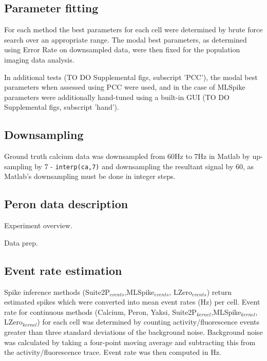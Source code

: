 \documentclass[a4paper,10pt,twocolumn]{article}
\begin{document}
\subsection*{Parameter fitting}
For each method the best parameters for each cell were determined by brute force search over an appropriate range. The modal best parameters, as determined using Error Rate on downsampled data, were then fixed for the population imaging data analysis. 

In additional tests (TO DO Supplemental figs, subscript 'PCC'), the modal best parameters when assessed using PCC were used, and in the case of MLSpike parameters were additionally hand-tuned using a built-in GUI (TO DO Supplemental figs, subscript 'hand'). 


\subsection*{Downsampling}
Ground truth calcium data was downsampled from 60Hz to 7Hz in Matlab by up-sampling by 7 - {\tt{interp(ca,7)}} and downsampling the resultant signal by 60, as Matlab's downsampling must be done in integer steps.

\subsection*{Peron data description}
Experiment overview. 

Data prep.

\subsection{Event rate estimation}
Spike inference methods (Suite2P$_{events}$,MLSpike$_{events}$, LZero$_{events}$) return estimated spikes which were converted into mean event rates (Hz) per cell. Event rate for continuous methods (Calcium, Peron, Yaksi, Suite2P$_{kernel}$,MLSpike$_{kernel}$, LZero$_{kernel}$) for each cell was determined by counting activity/fluorescence events greater than three standard deviations of the background noise. Background noise was calculated by taking a four-point moving average and subtracting this from the activity/fluorescence trace. Event rate was then computed in Hz.
\end{document}
